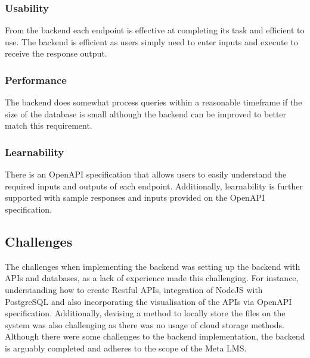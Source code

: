 \subsubsection{Usability}
From the backend each endpoint is effective at completing its task and efficient to use. The backend is efficient as users simply need to enter inputs and execute to receive the response output.

\subsubsection{Performance}
The backend does somewhat process queries within a reasonable timeframe if the size of the database is small although the backend can be improved to better match this requirement. 

\subsubsection{Learnability}
There is an OpenAPI specification that allows users to easily understand the required inputs and outputs of each endpoint. Additionally, learnability is further supported with sample responses and inputs provided on the OpenAPI specification.

\subsection{Challenges}
The challenges when implementing the backend was setting up the backend with APIs and databases, as a lack of experience made this challenging. For instance, understanding how to create Restful APIs, integration of NodeJS with PostgreSQL and also incorporating the visualisation of the APIs via OpenAPI specification. Additionally, devising a method to locally store the files on the system was also challenging as there was no usage of cloud storage methods. Although there were some challenges to the backend implementation, the backend is arguably completed and adheres to the scope of the Meta LMS.